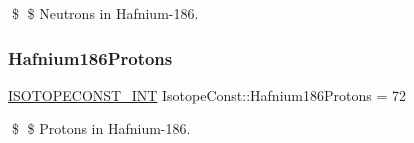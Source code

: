 \$ \$ Neutrons in Hafnium-\/186. \mbox{\label{group___isotope_const-_hafnium-_hf186_ga8e626123ab1cac79d1eeab907c3693f7}} 
\subsubsection{\texorpdfstring{Hafnium186\+Protons}{Hafnium186Protons}}
{\footnotesize\ttfamily \mbox{\hyperlink{group___isotope_const-_macros_ga5f18360b3e99483a35c32d789e62621c}{I\+S\+O\+T\+O\+P\+E\+C\+O\+N\+S\+T\+\_\+\+I\+NT}} Isotope\+Const\+::\+Hafnium186\+Protons = 72}

\$ \$ Protons in Hafnium-\/186. 